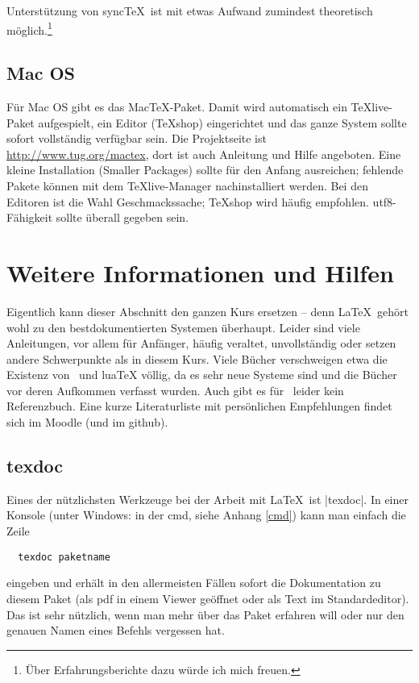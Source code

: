 \documentclass[12pt,ngerman]{scrartcl}
\newcommand{\TeXlive}{\TeX\textsf{live}\xspace}
\newcommand{\luaTeX}{\textsf{lua}\TeX\xspace}
\begin{document}
Unterstützung von sync\TeX\ ist mit etwas Aufwand zumindest theoretisch möglich.\footnote{Über Erfahrungsberichte dazu würde ich mich freuen.}

\subsection{Mac OS}
Für Mac OS gibt es das Mac\TeX-Paket. Damit wird automatisch ein \TeXlive-Paket aufgespielt, ein Editor (\TeX shop) eingerichtet und das ganze System sollte sofort vollständig verfügbar sein. Die Projektseite ist \url{http://www.tug.org/mactex}, dort ist auch Anleitung und Hilfe angeboten. Eine kleine Installation (\textsf{Smaller Packages}) sollte für den Anfang ausreichen; fehlende Pakete können mit dem \TeXlive-Manager nachinstalliert werden. Bei den Editoren ist die Wahl Geschmackssache; \TeX shop wird häufig empfohlen. utf8-Fähigkeit sollte überall gegeben sein.

\newpage
\section{Weitere Informationen und Hilfen}
Eigentlich kann dieser Abschnitt den ganzen Kurs ersetzen – denn \LaTeX\ gehört wohl zu den bestdokumentierten Systemen überhaupt. Leider sind viele Anleitungen, vor allem für Anfänger, häufig veraltet, unvollständig oder setzen andere Schwerpunkte als in diesem Kurs. Viele Bücher verschweigen etwa die Existenz von \XeTeX\ und \luaTeX völlig, da es sehr neue Systeme sind und die Bücher vor deren Aufkommen verfasst wurden. Auch gibt es für \ConTeXt\ leider kein Referenzbuch. Eine kurze Literaturliste mit persönlichen Empfehlungen findet sich im Moodle (und im github).

\subsection{texdoc}
Eines der nützlichsten Werkzeuge bei der Arbeit mit \LaTeX\ ist |texdoc|. In einer Konsole (unter Windows: in der cmd, siehe Anhang \ref{cmd}) kann man einfach die Zeile
\begin{verbatim}
  texdoc paketname
\end{verbatim}
eingeben und erhält in den allermeisten Fällen sofort die Dokumentation zu diesem Paket (als pdf in einem Viewer geöffnet oder als Text im Standardeditor). Das ist sehr nützlich, wenn man mehr über das Paket erfahren will oder nur den genauen Namen eines Befehls vergessen hat.
\end{document}
